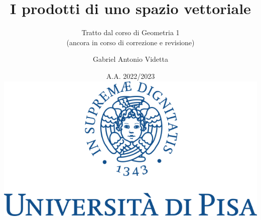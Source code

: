 \documentclass[11pt]{scrbook}
\begin{document}
	
	\title{I prodotti di uno spazio vettoriale}
	\subtitle{Tratto dal corso di Geometria 1\\(ancora in corso di correzione e revisione)}
	\author{Gabriel Antonio Videtta}
	\date{A.A. 2022/2023 \\ \vskip 1in \includegraphics[scale=0.3]{logo.png}}
	\maketitle
	
	\newpage
	\thispagestyle{empty}
	~\newpage
	
	\tableofcontents

	\newpage
	\thispagestyle{empty}
	~\newpage
	
	

	\newpage
	\thispagestyle{empty}
	~\newpage
	
	

	\newpage
	\thispagestyle{empty}
	~\newpage
	
	
	
\end{document}
